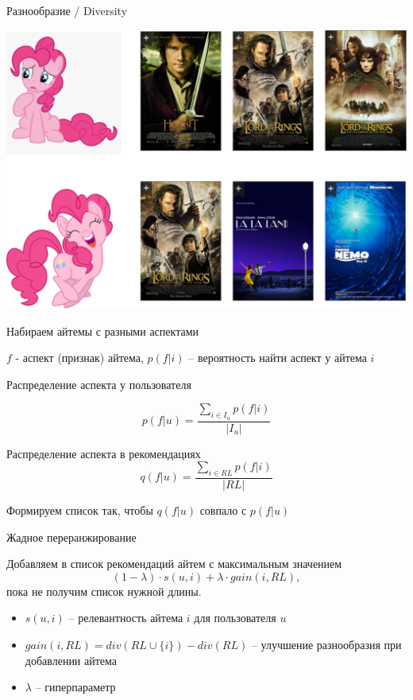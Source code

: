 \documentclass[11pt,aspectratio=169]{beamer}
\begin{document}
\begin{frame}{Разнообразие / Diversity}

\begin{center}
\includegraphics[scale=0.22]{images/diversity.png}
\end{center}

\end{frame}

\begin{frame}{Набираем айтемы с разными аспектами}

$f$ - аспект (признак) айтема, $p(f | i)$ -- вероятность найти аспект у айтема $i$

\vfill

Распределение аспекта у пользователя

\[
p(f | u) = \frac{\sum_{i \in I_u} p(f | i)}{|I_u|}  
\]

Распределение аспекта в рекомендациях
\[
q(f | u) = \frac{\sum_{i \in RL} p(f | i)}{|RL|}
\]

\begin{tcolorbox}[colback=info!5,colframe=info!80,title=]
Формируем список так, чтобы $q(f | u)$ совпало с $p(f | u)$
\end{tcolorbox}

\end{frame}

\begin{frame}{Жадное переранжирование}

\begin{tcolorbox}[colback=info!5,colframe=info!80,title=]
Добавляем в список рекомендаций айтем с максимальным значением
\[
(1 - \lambda) \cdot s(u, i) + \lambda \cdot gain(i, RL),
\]
пока не получим список нужной длины.
\end{tcolorbox}

\vfill

\begin{itemize}
\item $s(u, i)$ -- релевантность айтема $i$ для пользователя $u$ 
\item $gain(i, RL) = div(RL \cup \{i\}) - div(RL)$ -- улучшение разнообразия при добавлении айтема
\item $\lambda$ -- гиперпараметр
\end{itemize}

\end{frame}
\end{document}
